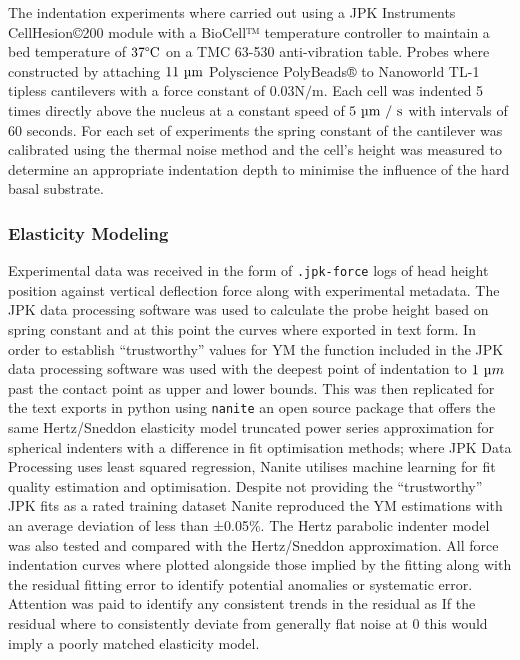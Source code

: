 \documentclass[
  paper=a4,
  ,captions=tableheading
]{scrartcl}
\begin{document}
The indentation experiments where carried out using a JPK Instruments
CellHesion©200 module with a BioCell™ temperature controller to maintain
a bed temperature of \(37 \degree \text{C}\) on a TMC 63-530
anti-vibration table. Probes where constructed by attaching
\(11\ \micro \text{m}\) Polyscience PolyBeads® to Nanoworld TL-1 tipless
cantilevers with a force constant of \(0.03 \text{N/m}\). Each cell was
indented 5 times directly above the nucleus at a constant speed of
\(5\ \micro \text{m / s}\) with intervals of 60 seconds. For each set of
experiments the spring constant of the cantilever was calibrated using
the thermal noise method and the cell's height was measured to determine
an appropriate indentation depth to minimise the influence of the hard
basal substrate.

\subsubsection{Elasticity Modeling}\label{elasticity-modeling}

Experimental data was received in the form of \texttt{.jpk-force} logs
of head height position against vertical deflection force along with
experimental metadata. The JPK data processing software was used to
calculate the probe height based on spring constant and at this point
the curves where exported in text form. In order to establish
``trustworthy'' values for YM the function included in the JPK data
processing software was used with the deepest point of indentation to
\(1 \ \micro m\) past the contact point as upper and lower bounds. This
was then replicated for the text exports in python using \texttt{nanite}
an open source package that offers the same Hertz/Sneddon elasticity
model truncated power series approximation for spherical indenters with
a difference in fit optimisation methods; where JPK Data Processing uses
least squared regression, Nanite utilises machine learning for fit
quality estimation and optimisation. Despite not providing the
``trustworthy'' JPK fits as a rated training dataset Nanite reproduced
the YM estimations with an average deviation of less than ±0.05\%. The
Hertz parabolic indenter model was also tested and compared with the
Hertz/Sneddon approximation. All force indentation curves where plotted
alongside those implied by the fitting along with the residual fitting
error to identify potential anomalies or systematic error. Attention was
paid to identify any consistent trends in the residual as If the
residual where to consistently deviate from generally flat noise at 0
this would imply a poorly matched elasticity model.
\end{document}
